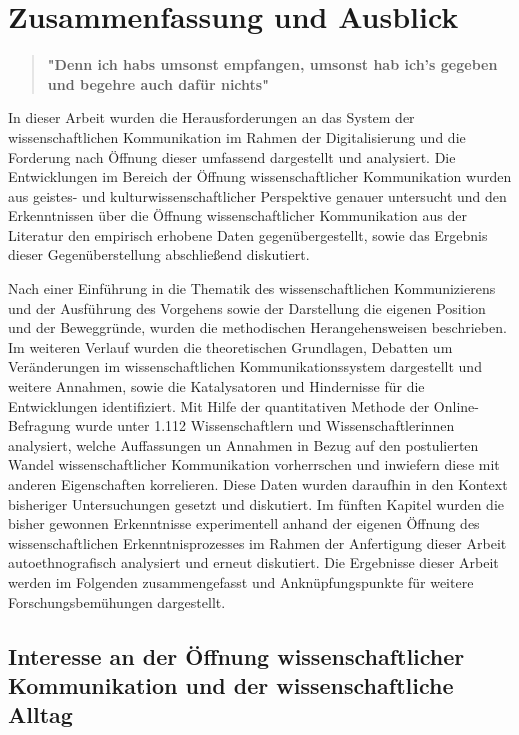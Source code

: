 \chapter{Zusammenfassung und Ausblick}

\begin{quote}
\textbf{"Denn ich habs umsonst empfangen, umsonst hab ich's gegeben und begehre auch dafür nichts"}
\end{quote} \cite{luther_1876}

In dieser Arbeit wurden die Herausforderungen an das System der wissenschaftlichen Kommunikation im Rahmen der Digitalisierung und die Forderung nach Öffnung dieser umfassend dargestellt und analysiert. Die Entwicklungen im Bereich der Öffnung wissenschaftlicher Kommunikation wurden aus geistes- und kulturwissenschaftlicher Perspektive genauer untersucht und den Erkenntnissen über die Öffnung wissenschaftlicher Kommunikation aus der Literatur den empirisch erhobene Daten gegenübergestellt, sowie das Ergebnis dieser Gegenüberstellung abschließend diskutiert.

Nach einer Einführung in die Thematik des wissenschaftlichen Kommunizierens und der Ausführung des Vorgehens sowie der Darstellung die eigenen Position und der Beweggründe, wurden die methodischen Herangehensweisen beschrieben. Im weiteren Verlauf wurden die theoretischen Grundlagen, Debatten um Veränderungen im wissenschaftlichen Kommunikationssystem dargestellt und weitere Annahmen, sowie die Katalysatoren und Hindernisse für die Entwicklungen identifiziert. Mit Hilfe der quantitativen Methode der Online-Befragung wurde unter 1.112 Wissenschaftlern und Wissenschaftlerinnen analysiert, welche Auffassungen un Annahmen in Bezug auf den postulierten Wandel wissenschaftlicher Kommunikation vorherrschen und inwiefern diese mit anderen Eigenschaften korrelieren. Diese Daten wurden daraufhin in den Kontext bisheriger Untersuchungen gesetzt und diskutiert. Im fünften Kapitel wurden die bisher gewonnen Erkenntnisse experimentell anhand der eigenen Öffnung des wissenschaftlichen Erkenntnisprozesses im Rahmen der Anfertigung dieser Arbeit autoethnografisch analysiert und erneut diskutiert. Die Ergebnisse dieser Arbeit werden im Folgenden zusammengefasst und Anknüpfungspunkte für weitere Forschungsbemühungen dargestellt.

\section{Interesse an der Öffnung wissenschaftlicher Kommunikation und der wissenschaftliche Alltag}

